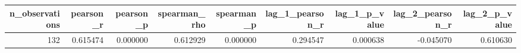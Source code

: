 \begin{tabular}{rrrrrrrrr}
\toprule
n\_observations & pearson\_r & pearson\_p & spearman\_rho & spearman\_p & lag\_1\_pearson\_r & lag\_1\_p\_value & lag\_2\_pearson\_r & lag\_2\_p\_value \\
\midrule
132 & 0.615474 & 0.000000 & 0.612929 & 0.000000 & 0.294547 & 0.000638 & -0.045070 & 0.610630 \\
\bottomrule
\end{tabular}
